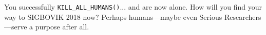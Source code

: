 You successfully \texttt{KILL\_ALL\_HUMANS()}...
and are now alone.
How will you find your way to SIGBOVIK 2018 now?
Perhaps humans---maybe even Serious Researchers---serve a purpose after all.

\failure


